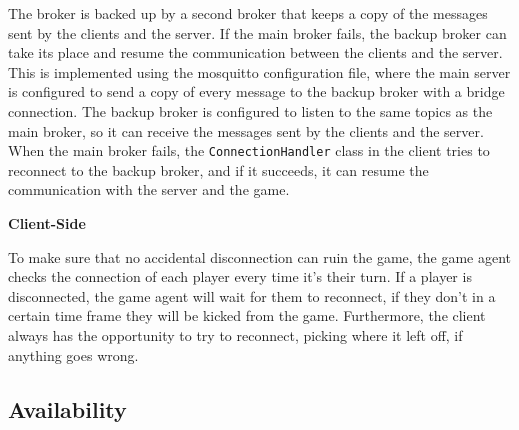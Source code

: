 \documentclass{scrartcl}
\begin{document}
\begin{itemize}
\begin{itemize}
                        The broker is backed up by a second broker that keeps a copy of the messages sent by the clients and the server.
                        If the main broker fails, the backup broker can take its place and resume the communication between the clients and the server.
                        This is implemented using the mosquitto configuration file, where the main server is configured to send a copy of every message to the backup broker with a bridge connection. \newline
                        The backup broker is configured to listen to the same topics as the main broker, so it can receive the messages sent by the clients and the server. \newline
                        When the main broker fails, the \texttt{ConnectionHandler} class in the client tries to reconnect to the backup broker, and if it succeeds, it can resume the communication with the server and the game. \newline
            \end{itemize}
            \textbf{Client-Side} \par
            To make sure that no accidental disconnection can ruin the game, the game agent checks the connection
            of each player every time it's their turn. If a player is disconnected, the game agent will wait for
            them to reconnect, if they don't in a certain time frame they will be kicked from the game. \newline
            Furthermore, the client always has the opportunity to try to reconnect, picking where it left
            off, if anything goes wrong.
\end{itemize}

\subsection{Availability}\label{availability}


\end{document}
